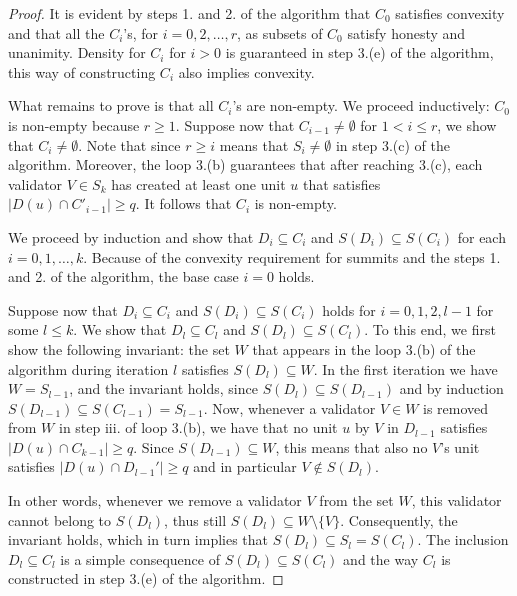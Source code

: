 \documentclass[12pt, fleqn]{article}
\begin{document}
\begin{proof}
 It is evident by steps 1. and 2. of the algorithm that $C_0$ satisfies convexity and that all the $C_i$'s, for $i=0,2, \ldots, r$, as subsets of $C_0$ satisfy honesty and unanimity. Density for $C_i$ for $i>0$ is guaranteed in step 3.(e) of the algorithm, this way of constructing $C_i$ also implies convexity. 

What remains to prove is that all $C_i$'s are non-empty.
%
We proceed inductively: $C_0$ is non-empty because $r\geq 1$. Suppose now that $C_{i-1}\neq \emptyset$ for $1<i\leq r$, we show that $C_{i}\neq \emptyset$. Note that since $r\geq i$ means that $S_i\neq \emptyset$ in step 3.(c) of the algorithm. Moreover, the loop 3.(b) guarantees that after reaching 3.(c), each validator $V\in S_k$ has created at least one unit $u$ that satisfies $|D(u)\cap C'_{i-1}|\geq q$.
%
It follows that $C_i$ is non-empty.

 We proceed by induction and show that $D_i \subseteq C_i$ and $S(D_i) \subseteq S(C_i)$ for each $i=0,1, \ldots, k$. Because of the convexity requirement for summits and the steps 1. and 2. of the algorithm, the base case $i=0$ holds.
%

Suppose now that $D_i \subseteq C_i$ and $S(D_i) \subseteq S(C_i)$ holds for $i=0,1,2, l-1$ for some $l\leq k$. We show that $D_l \subseteq C_l$ and $S(D_l) \subseteq S(C_l)$.
%
To this end, we first show the following invariant: the set $W$ that appears in the loop 3.(b) of the algorithm during iteration $l$ satisfies $S(D_l)\subseteq W$.
%
In  the first iteration we have $W=S_{l-1}$, and the invariant holds, since $S(D_l)\subseteq S(D_{l-1})$ and by induction $S(D_{l-1})\subseteq S(C_{l-1})=S_{l-1}$.
%
Now, whenever a validator $V\in W$ is removed from $W$ in step iii. of loop 3.(b), we have that no unit $u$ by $V$ in $D_{l-1}$ satisfies $|D(u) \cap C_{k-1}|\geq q$. Since $S(D_{l-1}) \subseteq W$, this means that also no $V$'s unit satisfies $|D(u) \cap D_{l-1}'|\geq q$ and in particular $V\notin S(D_l)$. 
%

In other words, whenever we remove a validator $V$ from the set $W$, this validator cannot belong to $S(D_l)$, thus still $S(D_l) \subseteq W \setminus \{V\}$.
%
Consequently, the invariant holds, which in turn implies that $S(D_l) \subseteq S_l =S(C_l)$.
%
The inclusion $D_l \subseteq C_l$ is a simple consequence of $S(D_l) \subseteq S(C_l)$ and the way $C_l$ is constructed in step 3.(e) of the algorithm.
\end{proof}
\end{document}
